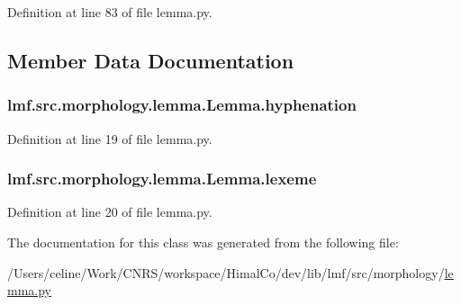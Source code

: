 Definition at line 83 of file lemma.\+py.



\subsection{Member Data Documentation}
\hypertarget{classlmf_1_1src_1_1morphology_1_1lemma_1_1_lemma_a225df7c63b5a3a654307bc2d24ed1937}{
\subsubsection[{hyphenation}]{\setlength{\rightskip}{0pt plus 5cm}lmf.\+src.\+morphology.\+lemma.\+Lemma.\+hyphenation}}\label{classlmf_1_1src_1_1morphology_1_1lemma_1_1_lemma_a225df7c63b5a3a654307bc2d24ed1937}


Definition at line 19 of file lemma.\+py.

\hypertarget{classlmf_1_1src_1_1morphology_1_1lemma_1_1_lemma_ab68007ef04c51304b92e3eefcf2f40c9}{
\subsubsection[{lexeme}]{\setlength{\rightskip}{0pt plus 5cm}lmf.\+src.\+morphology.\+lemma.\+Lemma.\+lexeme}}\label{classlmf_1_1src_1_1morphology_1_1lemma_1_1_lemma_ab68007ef04c51304b92e3eefcf2f40c9}


Definition at line 20 of file lemma.\+py.



The documentation for this class was generated from the following file\+:\begin{DoxyCompactItemize}
\item 
/\+Users/celine/\+Work/\+C\+N\+R\+S/workspace/\+Himal\+Co/dev/lib/lmf/src/morphology/\hyperlink{lemma_8py}{lemma.\+py}\end{DoxyCompactItemize}
